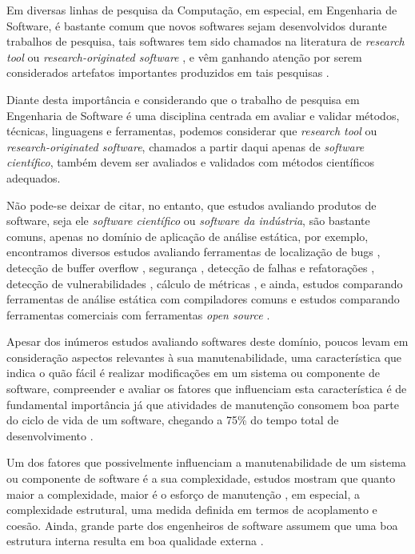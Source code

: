 Em diversas linhas de pesquisa da Computação, em especial, em Engenharia de
Software, é bastante comum que novos softwares sejam desenvolvidos durante
trabalhos de pesquisa, tais softwares tem sido chamados na literatura de {\it research tool}
\cite{Portillo12} ou {\it research-originated software} \cite{Kon2011}, e vêm
ganhando atenção por serem considerados artefatos importantes produzidos em tais
pesquisas \cite{Stodden2009}.

Diante desta importância e considerando que o trabalho de pesquisa em Engenharia de Software
é uma disciplina centrada em avaliar e validar métodos, técnicas, linguagens e
ferramentas, podemos considerar que {\it research tool} ou {\it
research-originated software}, chamados a partir daqui apenas de {\it software
científico}, também devem ser avaliados e validados com métodos
científicos adequados.

Não pode-se deixar de citar, no entanto, que estudos avaliando produtos de
software, seja ele {\it software científico} ou {\it software da indústria}, são bastante comuns, apenas
no domínio de aplicação de análise estática, por exemplo, encontramos diversos estudos
avaliando ferramentas de localização de bugs \cite{Rutar2004},
detecção de buffer overflow \cite{Kratkiewicz2005},
segurança \cite{Okun2007, Johns2011},
detecção de falhas e refatorações \cite{Wedyan2009},
detecção de vulnerabilidades \cite{Li2010, Ataide2014},
cálculo de métricas \cite{Alemerien2013}, e ainda, estudos
comparando ferramentas de análise estática com compiladores comuns \cite{Emanuelsson2008}
e estudos comparando ferramentas comerciais com ferramentas {\it open source} \cite{Al2010}.

Apesar dos inúmeros estudos avaliando softwares deste domínio,
poucos levam em consideração aspectos relevantes à sua
manutenabilidade, uma característica que indica o quão fácil é realizar
modificações em um sistema ou componente de software, compreender e avaliar os
fatores que influenciam esta característica é de fundamental importância já que
atividades de manutenção consomem boa parte do ciclo de vida de um software,
chegando a 75\% do tempo total de desenvolvimento \cite{aggarwal2002integrated, kumar2012survey}.

Um dos fatores que possivelmente influenciam a manutenabilidade de um sistema
ou componente de software é a sua complexidade, estudos mostram que quanto
maior a complexidade, maior é o esforço de manutenção \cite{Darcy2005}, em
especial, a complexidade estrutural, uma medida definida em termos de
acoplamento e coesão. Ainda, grande parte dos engenheiros de software assumem que uma
boa estrutura interna resulta em boa qualidade externa \cite{Fenton2014}.

